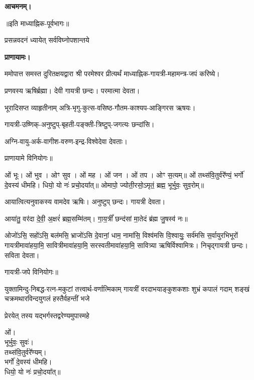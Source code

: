 \textbf{आचमनम्।}


\centerline{॥इति माध्याह्निक-पूर्वभागः॥}



{प्रसन्नवदनं ध्यायेत् सर्वविघ्नोपशान्तये}

\textbf{प्राणायामः।}

ममोपात्त समस्त दुरितक्षयद्वारा श्री परमेश्वर प्रीत्यर्थं माध्याह्निक-गायत्री-महामन्त्र-जपं करिष्ये।


प्रणवस्य ऋषिर्ब्रह्मा।
देवी गायत्री छन्दः।
परमात्मा देवता।

भूरादिसप्त व्याहृतीनाम् अत्रि-भृगु-कुत्स-वसिष्ठ-गौतम-काश्यप-आङ्गिरस ऋषयः।

गायत्री-उष्णिक्-अनुष्टुप्-बृहती-पङ्क्ती-त्रिष्टुप्-जगत्यः छन्दांसि।

अग्नि-वायु-अर्क-वागीश-वरुण-इन्द्र-विश्वेदेवा देवताः।
      
प्राणायामे विनियोगः॥


ओं भूः। ओं भुव। ओꣳ सुव। ओं मह। ओं जन। ओं तप। ओꣳ स॒त्यम्॥
ओं तथ्स॑वि॒तुर्वरे᳚ण्यं॒ भर्गो॑ दे॒वस्य॑ धीमहि। धियो॒ यो नः॑ प्रचो॒दया᳚त्॥
ओमापो॒ ज्योती॒रसो॒ऽमृतं॒ ब्रह्म॒ भूर्भुवः॒ सुव॒रोम्॥




आयात्वित्यनुवाकस्य वामदेव ऋषिः।
अनुष्टुप् छन्दः।
गायत्री देवता।

आया॑तु॒ वर॑दा दे॒वी॒ अ॒क्षरं॑ ब्रह्म॒सम्मि॑तम्। गा॒य॒त्रीं᳚ छन्द॑सां मा॒तेदं ब्र॑ह्म जु॒षस्व॑ नः॥

ओजो॑ऽसि॒ सहो॑ऽसि॒ बल॑मसि॒ भ्राजो॑ऽसि दे॒वानां॒ धाम॒ नामा॑सि॒ विश्व॑मसि वि॒श्वायुः॒ सर्व॑मसि स॒र्वायुरभिभूरों गायत्रीमावा॑हया॒मि॒ सावित्रीमावा॑हया॒मि॒ सरस्वतीमावा॑ह\-या॒मि॒ सावित्र्या ऋषिर्विश्वामित्रः। निचृद्गायत्री छन्दः। सविता देवता।

गायत्री-जपे विनियोगः॥



{युक्तामिन्दु-निबद्ध-रत्न-मकुटां तत्त्वार्थ-वर्णात्मिकाम्}
{गायत्रीं वरदाभयाङ्कुशकशाः शुभ्रं कपालं गदाम्}
{शङ्खं चक्रमथारविन्दयुगलं हस्तैर्वहन्तीं भजे}

{प्रेरयेत् तस्य यद्भर्गस्तद्वरेण्यमुपास्महे}


ओं।\\
भूर्भुवः॒ सुवः॑।\\
तथ्स॑वि॒तुर्वरे᳚ण्यम्।\\
भर्गो॑ दे॒वस्य॑ धीमहि।\\
धियो॒ यो नः॑ प्रचो॒दया᳚त्॥

